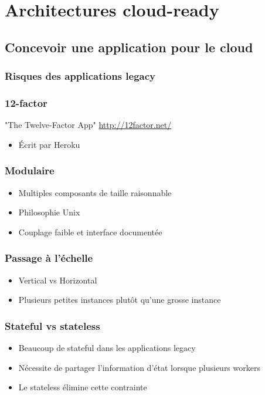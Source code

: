   \section[Architectures cloud]{Architectures cloud-ready}

  \subsection[Architecture dev]{Concevoir une application pour le cloud}

  \begin{frame}
    \frametitle{Risques des applications legacy}

  \end{frame}

  \begin{frame}
    \frametitle{12-factor}
    "The Twelve-Factor App" \url{http://12factor.net/}
    \begin{itemize}
      \item Écrit par Heroku
    \end{itemize}
  \end{frame}

  \begin{frame}
    \frametitle{Modulaire}
    \begin{itemize}
      \item Multiples composants de taille raisonnable
      \item Philosophie Unix
      \item Couplage faible et interface documentée
    \end{itemize}
  \end{frame}

  \begin{frame}
    \frametitle{Passage à l'échelle}
    \begin{itemize}
      \item Vertical vs Horizontal
      \item Plusieurs petites instances plutôt qu'une grosse instance
    \end{itemize}
  \end{frame}

  \begin{frame}
    \frametitle{Stateful vs stateless}
    \begin{itemize}
      \item Beaucoup de stateful dans les applications legacy
      \item Nécessite de partager l'information d'état lorsque plusieurs workers
      \item Le stateless élimine cette contrainte
    \end{itemize}
  \end{frame}

